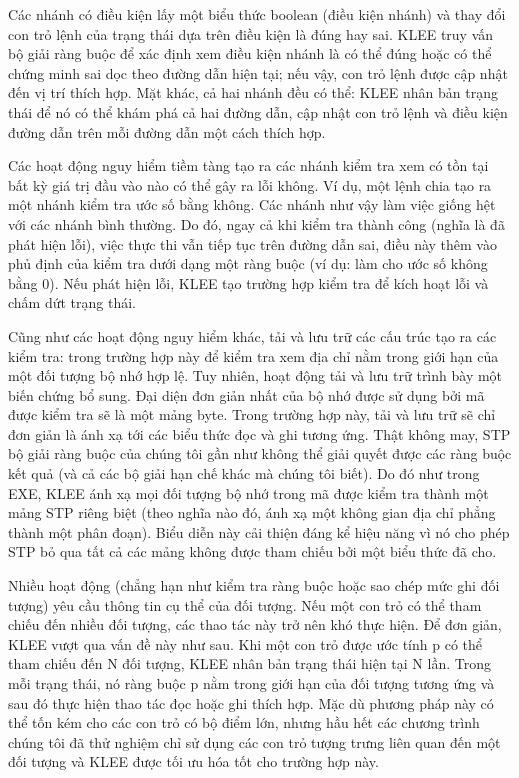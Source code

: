 \documentclass[12pt,a4paper]{article}
\begin{document}
\indent Các nhánh có điều kiện lấy một biểu thức boolean (điều kiện nhánh) và thay đổi con trỏ lệnh của trạng thái dựa trên điều kiện là đúng hay sai. KLEE truy vấn bộ giải ràng buộc để xác định xem điều kiện nhánh là có thể đúng hoặc có thể chứng minh sai dọc theo đường dẫn hiện tại; nếu vậy, con trỏ lệnh được cập nhật đến vị trí thích hợp. Mặt khác, cả hai nhánh đều có thể: KLEE nhân bản trạng thái để nó có thể khám phá cả hai đường dẫn, cập nhật con trỏ lệnh và điều kiện đường dẫn trên mỗi đường dẫn một cách thích hợp.

\indent Các hoạt động nguy hiểm tiềm tàng tạo ra các nhánh kiểm tra xem có tồn tại bất kỳ giá trị đầu vào nào có thể gây ra lỗi không. Ví dụ, một lệnh chia tạo ra một nhánh kiểm tra ước số bằng không. Các nhánh như vậy làm việc giống hệt với các nhánh bình thường. Do đó, ngay cả khi kiểm tra thành công (nghĩa là đã phát hiện lỗi), việc thực thi vẫn tiếp tục trên đường dẫn sai, điều này thêm vào phủ định của kiểm tra dưới dạng một ràng buộc (ví dụ: làm cho ước số không bằng 0). Nếu phát hiện lỗi, KLEE tạo trường hợp kiểm tra để kích hoạt lỗi và chấm dứt trạng thái.

\indent Cũng như các hoạt động nguy hiểm khác, tải và lưu trữ các cấu trúc tạo ra các kiểm tra: trong trường hợp này để kiểm tra xem địa chỉ nằm trong giới hạn của một đối tượng bộ nhớ hợp lệ. Tuy nhiên, hoạt động tải và lưu trữ trình bày một biến chứng bổ sung. Đại diện đơn giản nhất của bộ nhớ được sử dụng bởi mã được kiểm tra sẽ là một mảng byte. Trong trường hợp này, tải và lưu trữ sẽ chỉ đơn giản là ánh xạ tới các biểu thức đọc và ghi tương ứng. Thật không may, STP bộ giải ràng buộc của chúng tôi gần như không thể giải quyết được các ràng buộc kết quả (và cả các bộ giải hạn chế khác mà chúng tôi biết). Do đó như trong EXE, KLEE ánh xạ mọi đối tượng bộ nhớ trong mã được kiểm tra thành một mảng STP riêng biệt (theo nghĩa nào đó, ánh xạ một không gian địa chỉ phẳng thành một phân đoạn). Biểu diễn này cải thiện đáng kể hiệu năng vì nó cho phép STP bỏ qua tất cả các mảng không được tham chiếu bởi một biểu thức đã cho. 

\indent Nhiều hoạt động (chẳng hạn như kiểm tra ràng buộc hoặc sao chép mức ghi đối tượng) yêu cầu thông tin cụ thể của đối tượng. Nếu một con trỏ có thể tham chiếu đến nhiều đối tượng, các thao tác này trở nên khó thực hiện. Để đơn giản, KLEE vượt qua vấn đề này như sau. Khi một con trỏ được ước tính p có thể tham chiếu đến N đối tượng, KLEE nhân bản trạng thái hiện tại N lần. Trong mỗi trạng thái, nó ràng buộc p nằm trong giới hạn của đối tượng tương ứng và sau đó thực hiện thao tác đọc hoặc ghi thích hợp. Mặc dù phương pháp này có thể tốn kém cho các con trỏ có bộ điểm lớn, nhưng hầu hết các chương trình chúng tôi đã thử nghiệm chỉ sử dụng các con trỏ tượng trưng liên quan đến một đối tượng và KLEE được tối ưu hóa tốt cho trường hợp này.
\end{document}
